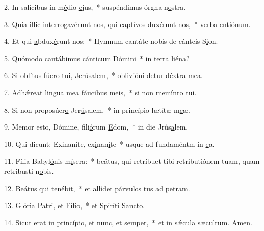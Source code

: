 2. In salícibus in m\uline{é}dio \uline{e}jus,~* suspéndimus órgna n\uline{o}stra.\par 
3. Quia illic interrogavérunt nos, qui capt\uline{í}vos dux\uline{é}runt nos,~* verba cnti\uline{ó}num.\par 
4. Et qui \uline{a}bdux\uline{é}runt nos:~* Hymnum cantáte nobis de cántcis S\uline{i}on.\par 
5. Quómodo cantábimus c\uline{á}nticum D\uline{ó}mini~* in terra li\uline{é}na?\par 
6. Si oblítus fúero t\uline{u}i, Jer\uline{ú}salem,~* oblivióni detur déxtra m\uline{e}a.\par 
7. Adhǽreat lingua mea f\uline{áu}cibus m\uline{e}is,~* si non memínro t\uline{u}i.\par 
8. Si non proposúer\uline{o} Jer\uline{ú}salem,~* in princípio lætítæ m\uline{e}æ.\par 
9. Memor esto, Dómine, fili\uline{ó}rum \uline{E}dom,~* in die Jrús\uline{a}lem.\par 
10. Qui dicunt: Exinaníte, ex\uline{i}nan\uline{í}te~* usque ad fundaméntm in \uline{e}a.\par 
11. Fília Babyl\uline{ó}nis m\uline{í}sera:~* beátus, qui retríbuet tibi retributiónem tuam, quam retribusti n\uline{o}bis.\par 
12. Beátus \uline{qui} ten\uline{é}bit,~* et allídet párvulos tus ad p\uline{e}tram.\par 
13. Glória P\uline{a}tri, et F\uline{í}lio,~* et Spiríti S\uline{a}ncto.\par 
14. Sicut erat in princípio, et n\uline{u}nc, et s\uline{e}mper,~* et in sǽcula sæculrum. \uline{A}men.\par 
